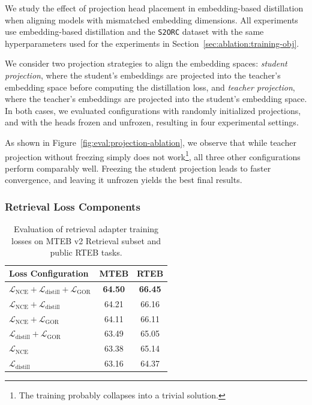 \documentclass[11pt]{article}
\begin{document}
We study the effect of projection head placement in embedding-based distillation when aligning models with mismatched embedding dimensions.
All experiments use embedding-based distillation and the \texttt{S2ORC} dataset with the same hyperparameters used for the experiments in Section~\ref{sec:ablation:training-obj}.

We consider two projection strategies to align the embedding spaces: \textit{student projection}, where the student's embeddings are projected into the teacher's embedding space before computing the distillation loss, and \textit{teacher projection}, where the teacher's embeddings are projected into the student's embedding space. In both cases, we evaluated configurations with randomly initialized projections, and with the heads frozen and unfrozen, resulting in four experimental settings.

As shown in Figure~\ref{fig:eval:projection-ablation}, we observe that while teacher projection without freezing simply does not work\footnote{The training probably collapses into a trivial solution.}, all three other configurations perform comparably well. Freezing the student projection leads to faster convergence, and leaving it unfrozen yields the best final results.


\subsubsection{Retrieval Loss Components}
\label{sec:eval:retrieval-component}


\begin{table}[t]
\centering
\caption{Evaluation of retrieval adapter training losses on MTEB v2 Retrieval subset and public RTEB tasks.}
\label{tab:loss_ablation}
\small
\setlength{\tabcolsep}{3pt}
\begin{tabular}{@{}lcc@{}}
\toprule
\textbf{Loss Configuration} & \textbf{MTEB} & \textbf{RTEB} \\
\midrule
$\mathcal{L}_{\text{NCE}} + \mathcal{L}_{\text{distill}} + \mathcal{L}_\text{GOR}$ & \textbf{64.50} & \textbf{66.45} \\
$\mathcal{L}_{\text{NCE}} + \mathcal{L}_{\text{distill}}$ & 64.21 & 66.16 \\
$\mathcal{L}_{\text{NCE}} + \mathcal{L}_\text{GOR}$ & 64.11 & 66.11 \\
$\mathcal{L}_{\text{distill}} + \mathcal{L}_\text{GOR}$ & 63.49 & 65.05 \\
$\mathcal{L}_{\text{NCE}}$ & 63.38 & 65.14 \\
$\mathcal{L}_{\text{distill}}$ & 63.16 & 64.37 \\
\bottomrule
\end{tabular}
\vspace{2pt}
\end{table}
\end{document}
